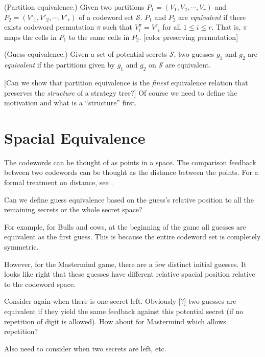 \begin{definition}
(Partition equivalence.) Given two partitions $P_1 = (V_1, V_2, \cdots, V_r)$ and $P_2 = (V'_1, V'_2, \cdots, V'_r)$ of a codeword set $\mathcal{S}$. $P_1$ and $P_2$ are \emph{equivalent} if there exists codeword permutation $\pi$ such that $V_i^\pi = V'_i$ for all $1 \le i \le r$. That is, $\pi$ maps the cells in $P_1$ to the same cells in $P_2$. [color preserving permutation]
\end{definition}

\begin{definition}
(Guess equivalence.) Given a set of potential secrets $\mathcal{S}$, two guesses $g_1$ and $g_2$ are \emph{equivalent} if the partitions given by $g_1$ and $g_2$ on $\mathcal{S}$ are equivalent.
\end{definition}

[Can we show that partition equivalence is the \emph{finest} equivalence relation that preserves the \emph{structure} of a strategy tree?] Of course we need to define the motivation and what is a ``structure'' first.

\section{Spacial Equivalence}

The codewords can be thought of as points in a space. The comparison feedback between two codewords can be thought as the distance between the points. For a formal treatment on distance, see \cite{stuckman06}.

Can we define guess equivalence based on the guess's relative position to all the remaining secrets or the whole secret space?

For example, for Bulls and cows, at the beginning of the game all guesses are equivalent as the first guess. This is because the entire codeword set is completely symmetric.

However, for the Mastermind game, there are a few distinct initial guesses. It looks like right that these guesses have different relative spacial position relative to the codeword space.

Consider again when there is one secret left. Obviously [?] two guesses are equivalent if they yield the same feedback against this potential secret (if no repetition of digit is allowed). How about for Mastermind which allows repetition?

Also need to consider when two secrets are left, etc.

